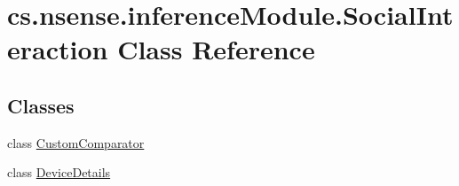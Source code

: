 \hypertarget{classcs_1_1nsense_1_1inference_module_1_1_social_interaction}{\section{cs.\-nsense.\-inference\-Module.\-Social\-Interaction Class Reference}
\label{classcs_1_1nsense_1_1inference_module_1_1_social_interaction}
}
\subsection*{Classes}
\begin{DoxyCompactItemize}
\item 
class \hyperlink{classcs_1_1nsense_1_1inference_module_1_1_social_interaction_1_1_custom_comparator}{Custom\-Comparator}
\item 
class \hyperlink{classcs_1_1nsense_1_1inference_module_1_1_social_interaction_1_1_device_details}{Device\-Details}
\end{DoxyCompactItemize}
